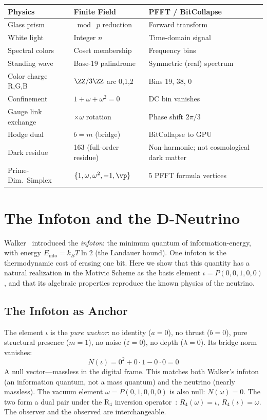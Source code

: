 \begin{center}
\begin{tabular}{@{}lll@{}}
\toprule
\textbf{Physics} & \textbf{Finite Field} & \textbf{PFFT / BitCollapse} \\
\midrule
Glass prism & $\bmod\; p$ reduction & Forward transform \\
White light & Integer $n$ & Time-domain signal \\
Spectral colors & Coset membership & Frequency bins \\
Standing wave & Base-19 palindrome & Symmetric (real) spectrum \\
Color charge R,G,B & $\ZZ/3\ZZ$ arc 0,1,2 & Bins 19, 38, 0 \\
Confinement & $1 + \omega + \omega^2 = 0$ & DC bin vanishes \\
Gauge link exchange & $\times\omega$ rotation & Phase shift $2\pi/3$ \\
Hodge dual & $b = m$ (bridge) & BitCollapse to GPU \\
Dark residue & 163 (full-order residue) & Non-harmonic; not cosmological dark matter \\
Prime-Dim.\ Simplex & $\{1, \omega, \omega^2, -1, \vp\}$ & 5 PFFT formula vertices \\
\bottomrule
\end{tabular}
\end{center}


\section{The Infoton and the D-Neutrino}

Walker~\cite{walker_infoton} introduced the \emph{infoton}: the minimum quantum of information-energy, with energy $E_{\mathrm{info}} = k_B T \ln 2$ (the Landauer bound). One infoton is the thermodynamic cost of erasing one bit. Here we show that this quantity has a natural realization in the Motivic Scheme as the basis element $\iota = P(0, 0, 1, 0, 0)$, and that its algebraic properties reproduce the known physics of the neutrino.

\subsection{The Infoton as Anchor}

The element $\iota$ is the \emph{pure anchor}: no identity ($a = 0$), no thrust ($b = 0$), pure structural presence ($m = 1$), no noise ($\varepsilon = 0$), no depth ($\lambda = 0$). Its bridge norm vanishes:
\[
N(\iota) = 0^2 + 0 \cdot 1 - 0 \cdot 0 = 0
\]
A null vector---massless in the digital frame. This matches both Walker's infoton (an information quantum, not a mass quantum) and the neutrino (nearly massless). The vacuum element $\omega = P(0, 1, 0, 0, 0)$ is also null: $N(\omega) = 0$. The two form a dual pair under the R$_4$ inversion operator~\cite{larue_lc}: $R_4(\omega) = \iota$, $R_4(\iota) = \omega$. The observer and the observed are interchangeable.

